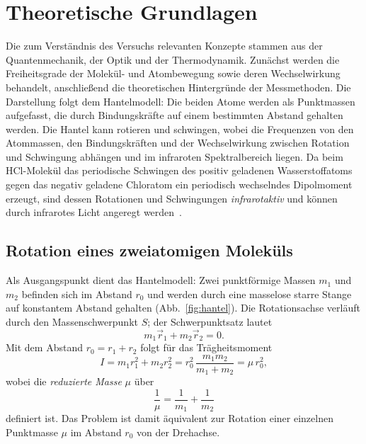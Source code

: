 \documentclass[11pt,a4paper]{article}
\begin{document}
\section{Theoretische Grundlagen}
\label{sec:theorie}

Die zum Verständnis des Versuchs relevanten Konzepte stammen aus der
Quantenmechanik, der Optik und der Thermodynamik. Zunächst werden die
Freiheitsgrade der Molekül- und Atombewegung sowie deren Wechselwirkung
behandelt, anschließend die theoretischen Hintergründe der Messmethoden. Die
Darstellung folgt dem Hantelmodell: Die beiden Atome werden als Punktmassen
aufgefasst, die durch Bindungskräfte auf einem bestimmten Abstand gehalten
werden. Die Hantel kann rotieren und schwingen, wobei die Frequenzen von den
Atommassen, den Bindungskräften und der Wechselwirkung zwischen Rotation und
Schwingung abhängen und im infraroten Spektralbereich liegen. Da beim HCl-Molekül
das periodische Schwingen des positiv geladenen Wasserstoffatoms gegen das
negativ geladene Chloratom ein periodisch wechselndes Dipolmoment erzeugt, sind
dessen Rotationen und Schwingungen \emph{infrarotaktiv} und können durch
infrarotes Licht angeregt werden~\cite{Riede,Bruegel,Herzberg}.

\subsection{Rotation eines zweiatomigen Moleküls}
\label{sec:rotation}

Als Ausgangspunkt dient das Hantelmodell: Zwei punktförmige Massen $m_1$ und
$m_2$ befinden sich im Abstand $r_0$ und werden durch eine masselose starre
Stange auf konstantem Abstand gehalten (Abb.~\ref{fig:hantel}). Die
Rotationsachse verläuft durch den Massenschwerpunkt $S$; der
Schwerpunktsatz lautet
\begin{equation}
  m_1 \vec{r}_1 + m_2 \vec{r}_2 = 0 .
\end{equation}
Mit dem Abstand $r_0 = r_1 + r_2$ folgt für das Trägheitsmoment
\begin{equation}
  I = m_1 r_1^2 + m_2 r_2^2 = r_0^2\,\frac{m_1 m_2}{m_1 + m_2} = \mu\,r_0^2 ,
  \label{eq:traegheit}
\end{equation}
wobei die \emph{reduzierte Masse} $\mu$ über
\begin{equation}
  \frac{1}{\mu} = \frac{1}{m_1} + \frac{1}{m_2}
\end{equation}
definiert ist. Das Problem ist damit äquivalent zur Rotation einer einzelnen
Punktmasse $\mu$ im Abstand $r_0$ von der Drehachse.
\end{document}
